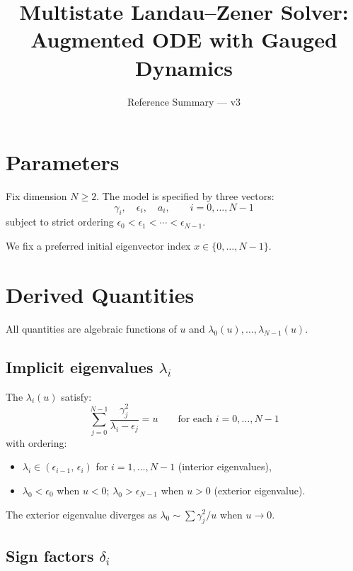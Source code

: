 \documentclass[11pt]{article}
\title{Multistate Landau--Zener Solver:\\Augmented ODE with Gauged Dynamics}
\author{Reference Summary --- v3}
\date{}
\begin{document}
\maketitle

\section{Parameters}

Fix dimension $N \geq 2$.  The model is specified by three vectors:
\[
  \gamma_i, \quad \epsilon_i, \quad a_i, \qquad i = 0, \dots, N{-}1
\]
subject to strict ordering $\epsilon_0 < \epsilon_1 < \cdots < \epsilon_{N-1}$.

We fix a preferred initial eigenvector index $x \in \{0,\dots,N{-}1\}$.

\section{Derived Quantities}

All quantities are algebraic functions of $u$ and $\lambda_0(u),\dots,\lambda_{N-1}(u)$.

\subsection{Implicit eigenvalues $\lambda_i$}

The $\lambda_i(u)$ satisfy:
\begin{equation}\label{eq:lambda-implicit}
  \sum_{j=0}^{N-1} \frac{\gamma_j^2}{\lambda_i - \epsilon_j} = u
  \qquad \text{for each } i = 0,\dots,N{-}1
\end{equation}
with ordering:
\begin{itemize}[nosep]
  \item $\lambda_i \in (\epsilon_{i-1},\, \epsilon_i)$ for $i = 1,\dots,N{-}1$ \quad (interior eigenvalues),
  \item $\lambda_0 < \epsilon_0$ when $u < 0$; \quad $\lambda_0 > \epsilon_{N-1}$ when $u > 0$ \quad (exterior eigenvalue).
\end{itemize}
The exterior eigenvalue diverges as $\lambda_0 \sim \sum\gamma_j^2 / u$ when $u \to 0$.

\subsection{Sign factors $\delta_i$}
\end{document}
